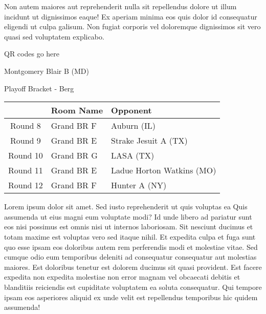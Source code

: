 \documentclass{article}%
\begin{document}
\newline%
Non autem maiores aut reprehenderit nulla sit repellendus dolore ut illum incidunt ut dignissimos eaque! Ex aperiam minima eos quis dolor id consequatur eligendi ut culpa galisum. Non fugiat corporis vel doloremque dignissimos sit vero quasi sed voluptatem explicabo.\newline%
\newline%
%
\vspace*{30pt}%
\begin{center}%
\begin{Huge}%
QR codes go here%
\end{Huge}%
\end{center}%
\newpage%
\begin{center}%
\begin{Huge}%
Montgomery Blair B (MD)%
\end{Huge}%
\vspace*{8pt}%
\linebreak%
\begin{Large}%
Playoff Bracket {-} Berg%
\end{Large}%
\end{center}%
%
\begin{tabularx}{\textwidth}{|c|Y|Y|}%
\hline%
&Room Name&Opponent\\%
\hline%
Round 8&Grand BR F&Auburn (IL)\\%
Round 9&Grand BR E&Strake Jesuit A (TX)\\%
Round 10&Grand BR G&LASA (TX)\\%
Round 11&Grand BR E&Ladue Horton Watkins (MO)\\%
Round 12&Grand BR F&Hunter A (NY)\\%
\hline%
\end{tabularx}%
\vspace*{8pt}%
\linebreak%
\newline%
\newline%
Lorem ipsum dolor sit amet. Sed iusto reprehenderit ut quis voluptas ea Quis assumenda ut eius magni eum voluptate modi? Id unde libero ad pariatur sunt eos nisi possimus est omnis nisi ut internos laboriosam. Sit nesciunt ducimus et totam maxime est voluptas vero sed itaque nihil. Et expedita culpa et fuga sunt quo esse ipsam eos doloribus autem rem perferendis modi et molestiae vitae.\newline%
\newline%
Sed cumque odio eum temporibus deleniti ad consequatur consequatur aut molestias maiores. Est doloribus tenetur est dolorem ducimus sit quasi provident. Est facere expedita non expedita molestiae non error magnam vel obcaecati debitis et blanditiis reiciendis est cupiditate voluptatem ea soluta consequatur. Qui tempore ipsam eos asperiores aliquid ex unde velit est repellendus temporibus hic quidem assumenda!\newline%
\end{document}
